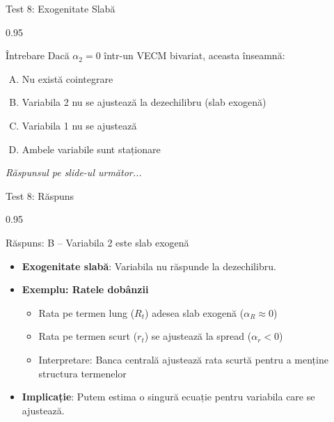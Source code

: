 \documentclass[9pt, aspectratio=169, t]{beamer}
\begin{document}
\begin{frame}{Test 8: Exogenitate Slabă}
    \begin{cminipage}{0.95\textwidth}
    \begin{alertblock}{Întrebare}
        Dacă $\alpha_2 = 0$ într-un VECM bivariat, aceasta înseamnă:
    \end{alertblock}

    \vspace{0.3cm}

    \begin{enumerate}[A)]\setlength{\itemsep}{0pt}
        \item Nu există cointegrare
        \item Variabila 2 nu se ajustează la dezechilibru (slab exogenă)
        \item Variabila 1 nu se ajustează
        \item Ambele variabile sunt staționare
    \end{enumerate}

    \vspace{0.5cm}
    \begin{flushright}\textit{Răspunsul pe slide-ul următor...}\end{flushright}
    \end{cminipage}
\end{frame}

\begin{frame}{Test 8: Răspuns}
    \begin{cminipage}{0.95\textwidth}
    \begin{exampleblock}{Răspuns: B -- Variabila 2 este slab exogenă}
        \begin{itemize}\setlength{\itemsep}{0pt}
            \item \textbf{Exogenitate slabă}: Variabila nu răspunde la dezechilibru.
            \item \textbf{Exemplu: Ratele dobânzii}
            \begin{itemize}\setlength{\itemsep}{0pt}
                \item Rata pe termen lung ($R_t$) adesea slab exogenă ($\alpha_R \approx 0$)
                \item Rata pe termen scurt ($r_t$) se ajustează la spread ($\alpha_r < 0$)
                \item Interpretare: Banca centrală ajustează rata scurtă pentru a menține structura termenelor
            \end{itemize}
            \item \textbf{Implicație}: Putem estima o singură ecuație pentru variabila care se ajustează.
        \end{itemize}
    \end{exampleblock}
    \end{cminipage}
\end{frame}
\end{document}
